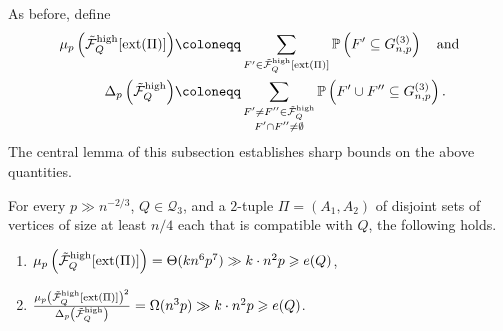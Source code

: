\documentclass[11pt,a4paper,oneside,reqno]{amsart}
\newcommand{\Gnp}{G_{n, p}^{(3)}}
\newcommand{\cF}{\mathcal{F}}
\newcommand{\cQ}{\mathcal{Q}}
\renewcommand{\Pr}{\mathbb{P}}
\newcommand{\1}{\mathbbm{1}} %
\renewcommand{\ge}{\geqslant}
\newcommand{\cTFQH}{\Tilde{\cF}_Q^{\mathrm{high}}}
\newcommand{\ext}{\mathrm{ext}}
\begin{document}
As before, define
\begin{align*}
    \mu_p\left(\cTFQH[\ext(\Pi)] \right) &\coloneqq \sum_{F' \in \cTFQH[\ext(\Pi)]} \Pr\left(F' \subseteq \Gnp\right) \quad \text{and}\\
    \Delta_p\left(\cTFQH \right) &\coloneqq \sum_{\substack{F' \neq F'' \in \cTFQH  \\ F' \cap F'' \neq \emptyset}} \Pr\left(F' \cup F'' \subseteq \Gnp\right).
\end{align*}
The central lemma of this subsection establishes sharp bounds on the above quantities.
\begin{lemma}\label{lemma:mu-Delta-bound-high-degree}
    For every $p \gg n^{-2/3}$, $Q \in \cQ_3$, and a $2$-tuple $\Pi = (A_1, A_2)$ of disjoint sets of vertices of size at least $n/4$ each that is compatible with $Q$, the following holds. 
    \begin{enumerate}
        \item $\mu_p\left(\cTFQH[\ext(\Pi)]\right) = \Theta(k n^6 p^7) \gg k \cdot n^2 p \ge e(Q)$,
        \item $\frac{\mu_p\left(\cTFQH[\ext(\Pi)]\right)^2}{\Delta_p\left(\cTFQH\right)} = \Omega(n^3 p) \gg k \cdot n^2 p \ge e(Q)$.
    \end{enumerate}
\end{lemma}
\end{document}
